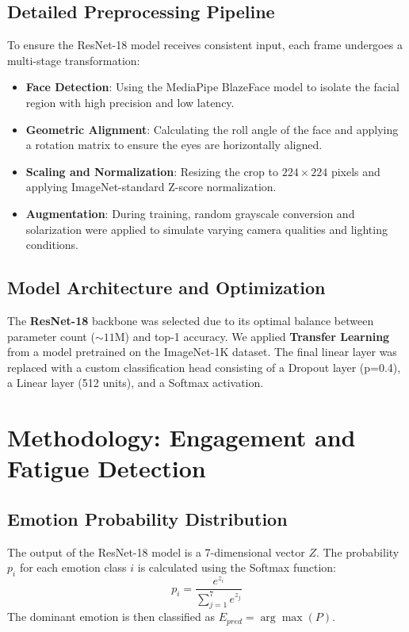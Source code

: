 \documentclass[conference]{IEEEtran}
\begin{document}
\subsection{Detailed Preprocessing Pipeline}
To ensure the ResNet-18 model receives consistent input, each frame undergoes a multi-stage transformation:
\begin{itemize}[leftmargin=*]
    \item \textbf{Face Detection}: Using the MediaPipe BlazeFace model to isolate the facial region with high precision and low latency.
    \item \textbf{Geometric Alignment}: Calculating the roll angle of the face and applying a rotation matrix to ensure the eyes are horizontally aligned.
    \item \textbf{Scaling and Normalization}: Resizing the crop to $224 \times 224$ pixels and applying ImageNet-standard Z-score normalization.
    \item \textbf{Augmentation}: During training, random grayscale conversion and solarization were applied to simulate varying camera qualities and lighting conditions.
\end{itemize}

\subsection{Model Architecture and Optimization}
The \textbf{ResNet-18} backbone was selected due to its optimal balance between parameter count ($\sim 11$M) and top-1 accuracy. We applied \textbf{Transfer Learning} from a model pretrained on the ImageNet-1K dataset. The final linear layer was replaced with a custom classification head consisting of a Dropout layer (p=0.4), a Linear layer (512 units), and a Softmax activation.

\section{Methodology: Engagement and Fatigue Detection}

\subsection{Emotion Probability Distribution}
The output of the ResNet-18 model is a 7-dimensional vector $Z$. The probability $p_i$ for each emotion class $i$ is calculated using the Softmax function:
\begin{equation}
    p_i = \frac{e^{z_i}}{\sum_{j=1}^{7} e^{z_j}}
\end{equation}
The dominant emotion is then classified as $E_{pred} = \arg\max(P)$.
\end{document}

